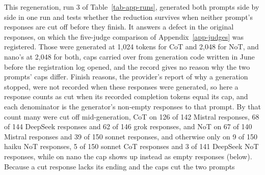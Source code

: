 This regeneration, run 3 of Table~\ref{tab-app-runs}, generated both prompts
side by side in one run and tests whether the reduction survives when neither
prompt's responses are cut off before they finish. It answers a defect in the
original responses, on which the five-judge comparison of
Appendix~\ref{app-judges} was registered. Those were generated at 1,024
tokens for CoT and 2,048 for NoT, and nano's at 2,048 for both, caps carried
over from generation code written in June before the registration log opened,
and the record gives no reason why the two prompts' caps differ.
Finish reasons, the provider's report of why a generation stopped, were not
recorded when these responses were generated, so here
a response counts as cut when its recorded completion tokens equal its cap,
and each denominator is the generator's non-empty responses to that prompt.
By that count many were cut off mid-generation, CoT on 126 of 142 Mistral
responses, 68 of 144 DeepSeek responses and 62 of 146 grok responses, and NoT
on 67 of 140 Mistral responses and 39 of 150 sonnet responses, and otherwise
only on 9 of 150 haiku NoT responses, 5 of 150 sonnet CoT responses and 3 of
141 DeepSeek NoT responses, while on nano the cap shows up instead as empty
responses (below).
Because a cut response lacks its ending and the caps cut the two prompts
